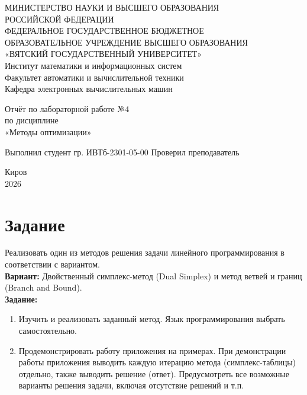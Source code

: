\documentclass[oneside,a4paper,14pt]{extarticle}
\begin{document}
\newpage\thispagestyle{empty}
\begin{center}
	МИНИСТЕРСТВО НАУКИ И ВЫСШЕГО ОБРАЗОВАНИЯ\\
	РОССИЙСКОЙ ФЕДЕРАЦИИ\\
	ФЕДЕРАЛЬНОЕ ГОСУДАРСТВЕННОЕ БЮДЖЕТНОЕ\\
	ОБРАЗОВАТЕЛЬНОЕ УЧРЕЖДЕНИЕ ВЫСШЕГО ОБРАЗОВАНИЯ\\
	«ВЯТСКИЙ ГОСУДАРСТВЕННЫЙ УНИВЕРСИТЕТ»\\
	Институт математики и информационных систем\\
	Факультет автоматики и вычислительной техники\\
	Кафедра электронных вычислительных машин
\end{center}
\vspace{20mm}
\begin{center}
	Отчёт по лабораторной работе №4\\
	по дисциплине\\
	«Методы оптимизации»\\
\end{center}
\vfill
Выполнил студент гр. ИВТб-2301-05-00 \hfill
{}
Проверил преподаватель\hfill
{}
\vfill
\begin{center}
	Киров\\
	2026
\end{center}
\newpage
\setcounter{page}{1}
\tableofcontents
\newpage

\section*{Задание}
Реализовать один из методов решения задачи линейного программирования в соответствии с вариантом.\\

\textbf{Вариант:} Двойственный симплекс-метод (Dual Simplex) и метод ветвей и границ (Branch and Bound).\\

\textbf{Задание:}
\begin{enumerate}
	\item Изучить и реализовать заданный метод. Язык программирования выбрать самостоятельно.
	\item Продемонстрировать работу приложения на примерах. При демонстрации работы приложения выводить каждую итерацию метода (симплекс-таблицы) отдельно, также выводить решение (ответ). Предусмотреть все возможные варианты решения задачи, включая отсутствие решений и т.п.
\end{enumerate}
\end{document}
